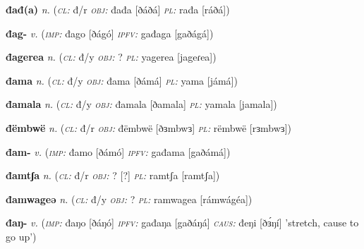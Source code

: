 \newentry
\headword\textbf{đađ(a)}  
\ipa{[ðáð(á)]}
\synpos\textit{n.} 
\class(\textit{\textsc{cl:}} {đ/r}
\object\textit{\textsc{obj:}} đađa [ðáðá]
\plural\textit{\textsc{pl:}} rađa [ráðá])

\newentry
\headword\textbf{đag-}  
\ipa{[ðág-]}
\synpos\textit{v.} 
\imperative(\textit {\textsc{imp:}} đago [ðágó]
\imperfective\textit {\textsc{ipfv:}} gađaga [gaðágá])

\newentry
\headword\textbf{đagerea}  
\ipa{[ðageɾea]}
\synpos\textit{n.} 
\class(\textit{\textsc{cl:}} {đ/y}
\object\textit{\textsc{obj:}} ? 
\plural\textit{\textsc{pl:}} yagerea [jageɾea])

\newentry
\headword\textbf{đama}  
\ipa{[ðámá]}
\synpos\textit{n.} 
\class(\textit{\textsc{cl:}} {đ/y}
\object\textit{\textsc{obj:}} đama [ðámá]
\plural\textit{\textsc{pl:}} yama [jámá])

\newentry
\headword\textbf{đamala}  
\ipa{[ðamala]}
\synpos\textit{n.} 
\class(\textit{\textsc{cl:}} {đ/y}
\object\textit{\textsc{obj:}} đamala [ðamala]
\plural\textit{\textsc{pl:}} yamala [jamala])

\newentry
\headword\textbf{đëmbwë}  
\ipa{[ðɜmbwɜ]}
\synpos\textit{n.} 
\class(\textit{\textsc{cl:}} {đ/r}
\object\textit{\textsc{obj:}} đëmbwë [ðɜmbwɜ]
\plural\textit{\textsc{pl:}} rëmbwë [rɜmbwɜ])


\newentry
\headword\textbf{đam-}  
\ipa{[ðám-]}
\synpos\textit{v.} 
\imperative(\textit {\textsc{imp:}} đamo [ðámó]
\imperfective\textit {\textsc{ipfv:}} gađama [gaðámá])

\newentry
\headword\textbf{đamtʃa}  
\ipa{[ðamtʃa]}
\synpos\textit{n.} 
\class(\textit{\textsc{cl:}} {đ/r}
\object\textit{\textsc{obj:}} ? [?]
\plural\textit{\textsc{pl:}} ramtʃa [ramtʃa])

\newentry
\headword\textbf{đamwageə}  
\ipa{[ðámwágéə]}
\synpos\textit{n.} 
\class(\textit{\textsc{cl:}} {đ/y}
\object\textit{\textsc{obj:}} ? 
\plural\textit{\textsc{pl:}} ramwagea [rámwágéa])


\newentry
\headword\textbf{đaŋ-}  
\ipa{[ðáŋ-]}
\synpos\textit{v.} 
\imperative(\textit {\textsc{imp:}} đaŋo [ðáŋó]
\imperfective\textit {\textsc{ipfv:}} gađaŋa [gaðáŋá]
\causative\textit {\textsc{caus:}} đeŋi [ðɜ́ŋí] 'stretch, cause to go up')


